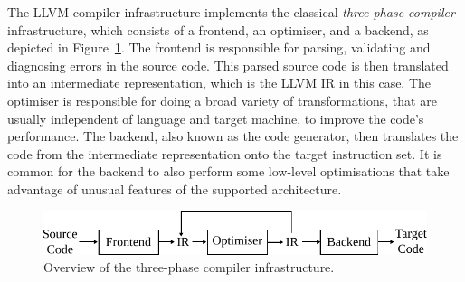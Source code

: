 The LLVM compiler infrastructure implements the classical \textit{three-phase compiler} infrastructure, which consists of a frontend, an optimiser, and a backend, as depicted in Figure~\ref{fig:3-phase-compiler}.
The frontend is responsible for parsing, validating and diagnosing errors in the source code.
This parsed source code is then translated into an intermediate representation, which is the LLVM IR in this case.
The optimiser is responsible for doing a broad variety of transformations, that are usually independent of language and target machine, to improve the code's performance.
The backend, also known as the code generator, then translates the code from the intermediate representation onto the target instruction set.
It is common for the backend to also perform some low-level optimisations that take advantage of unusual features of the supported architecture.

\begin{figure}[h]
  \centering
  \includegraphics[scale=0.9]{figs/3-phase-compiler.pdf}
  \caption{Overview of the three-phase compiler infrastructure.}
  \label{fig:3-phase-compiler}
\end{figure}



